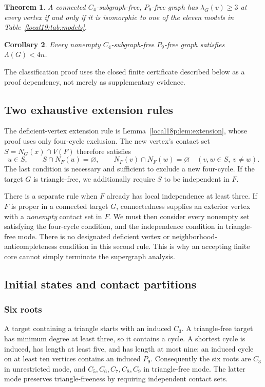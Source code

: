 \documentclass[11pt,a4paper]{article}
\newtheorem{theorem}{Theorem}[section]
\newtheorem{corollary}[theorem]{Corollary}
\theoremstyle{definition}\newtheorem{definition}[theorem]{Definition}
\theoremstyle{remark}\newtheorem{remark}[theorem]{Remark}
\begin{document}
\begin{theorem}\label{local19:thm:main}
A connected $C_4$-subgraph-free, $P_9$-free graph has
$\lambda_G(v)\ge3$ at every vertex if and only if it is isomorphic to one
of the eleven models in Table~\ref{local19:tab:models}.
\end{theorem}
\begin{corollary}\label{local19:cor:density}
Every nonempty $C_4$-subgraph-free $P_9$-free graph satisfies $\Lambda(G)<4n$.
\end{corollary}
The classification proof uses the closed finite certificate described
below as a proof dependency, not merely as supplementary evidence.

\subsection{Two exhaustive extension rules}
The deficient-vertex extension rule is
Lemma~\ref{local18p:lem:extension}, whose proof uses only four-cycle exclusion.
The new vertex's contact set $S=N_G(x)\cap V(F)$ therefore satisfies
\begin{equation}\label{local19:eq:forcedcontacts}
 u\in S,\qquad S\cap N_F(u)=\varnothing,\qquad
 N_F(v)\cap N_F(w)=\varnothing\quad(v,w\in S,\ v\ne w).
\end{equation}
The last condition is necessary and sufficient to exclude a new
four-cycle. If the target $G$ is triangle-free, we additionally require
$S$ to be independent in $F$.

There is a separate rule when $F$ already has local independence at
least three. If $F$ is proper in a connected target $G$, connectedness
supplies an exterior vertex with a \emph{nonempty} contact set in $F$.
We must then consider every nonempty set satisfying the four-cycle
condition, and the independence condition in triangle-free mode.
There is no designated deficient vertex or neighborhood-anticompleteness
condition in this second rule. This is why an accepting finite core
cannot simply terminate the supergraph analysis.

\subsection{Initial states and contact partitions}
\subsubsection{Six roots}
A target containing a triangle starts with an induced $C_3$.
A triangle-free target has minimum degree at least three, so it contains
a cycle. A shortest cycle is induced, has length at least five, and
has length at most nine: an induced cycle on at least ten vertices
contains an induced $P_9$. Consequently the six roots are $C_3$ in
unrestricted mode, and $C_5,C_6,C_7,C_8,C_9$ in triangle-free mode.
The latter mode preserves triangle-freeness by requiring independent
contact sets.
\end{document}
